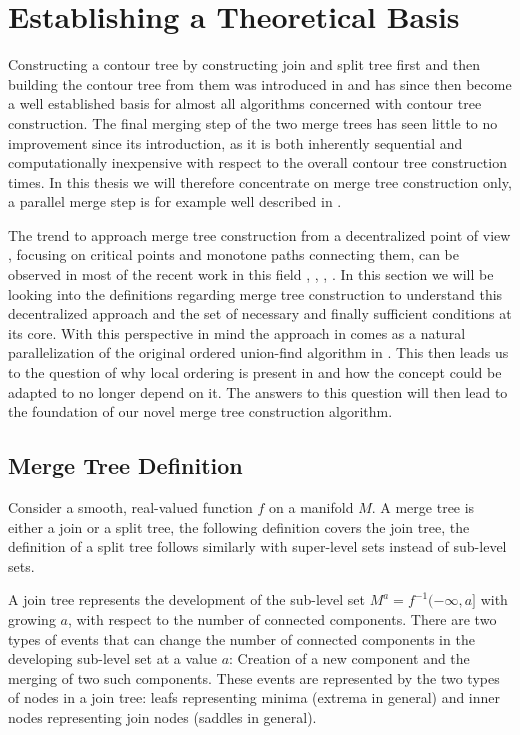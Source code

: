 \documentclass[%
	paper=A4,					%
	twoside=true,				%
	openright,					%
	parskip=full,				%
	chapterprefix=true,			%
	11pt,						%
	headings=normal,			%
	bibliography=totoc,			%
	listof=totoc,				%
	titlepage=on,				%
	captions=tableabove,		%
	draft=false,				%
]{scrreprt}%
\begin{document}
\chapter{Establishing a Theoretical Basis} \label{sec:num2}
Constructing a contour tree by constructing join and split tree first and then building the contour tree from them was introduced in \cite{orig} and has since then become a well established basis for almost all algorithms concerned with contour tree construction. The final merging step of the two merge trees has seen little to no improvement since its introduction, as it is both inherently sequential and computationally inexpensive with respect to the overall contour tree construction times. In this thesis we will therefore concentrate on merge tree construction only, a parallel merge step is for example well described in \cite{Carr}.

The trend to approach merge tree construction from a decentralized point of view \cite{base}, focusing on critical points and monotone paths connecting them, can be observed in most of the recent work in this field \cite{Carr}, \cite{FTM}, \cite{adhoc}, \cite{Maadasamy}. In this section we will be looking into the definitions regarding merge tree construction to understand this decentralized approach and the set of necessary and finally sufficient conditions at its core. With this perspective in mind the approach in \cite{FTM} comes as a natural parallelization of the original ordered union-find algorithm in \cite{pascucci1}. This then leads us to the question of why local ordering is present in \cite{FTM} and how the concept could be adapted to no longer depend on it. The answers to this question will then lead to the foundation of our novel merge tree construction algorithm.

\section{Merge Tree Definition}
Consider a smooth, real-valued function \(f\) on a manifold \(M\). A merge tree is either a join or a split tree, the following definition covers the join tree, the definition of a split tree follows similarly with super-level sets instead of sub-level sets. 

A join tree represents the development of the sub-level set \(M^{a} = f^{-1}(-\infty, a]\) with growing \(a\), with respect to the number of connected components. There are two types of events that can change the number of connected components in the developing sub-level set at a value \(a\): Creation of a new component and the merging of two such components. These events are represented by the two types of nodes in a join tree: leafs representing minima (extrema in general) and inner nodes representing join nodes (saddles in general). 
\end{document}
